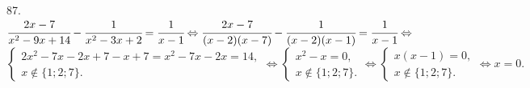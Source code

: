 87. $\cfrac{2x-7}{x^2-9x+14}-\cfrac{1}{x^2-3x+2}=\cfrac{1}{x-1}\Leftrightarrow
\cfrac{2x-7}{(x-2)(x-7)}-\cfrac{1}{(x-2)(x-1)}=\cfrac{1}{x-1}\Leftrightarrow$\\$
\begin{cases} 2x^2-7x-2x+7-x+7=x^2-7x-2x=14,\\
x\notin\{1;2;7\}.\end{cases}\Leftrightarrow
\begin{cases} x^2-x=0,\\
x\notin\{1;2;7\}.\end{cases}\Leftrightarrow
\begin{cases} x(x-1)=0,\\
x\notin\{1;2;7\}.\end{cases}\Leftrightarrow x=0.$\\
